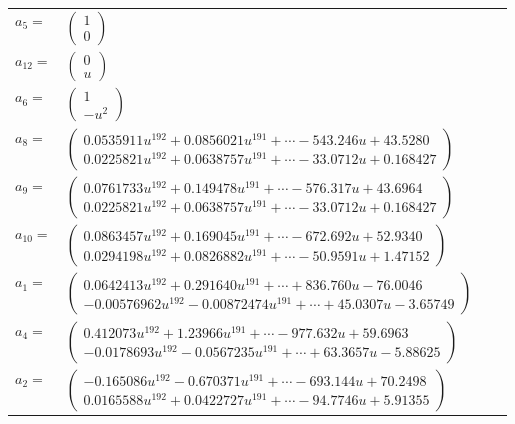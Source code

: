 \documentclass[1p]{elsarticle_modified}
\theoremstyle{definition}
\begin{document}
\begin{tabular}{m{7pt} m{180pt} m{7pt} m{180pt} }
\flushright $a_{5}=$&$\begin{pmatrix}1\\0\end{pmatrix}$ \\
\flushright $a_{12}=$&$\begin{pmatrix}0\\u\end{pmatrix}$ \\
\flushright $a_{6}=$&$\begin{pmatrix}1\\- u^2\end{pmatrix}$ \\
\flushright $a_{8}=$&$\begin{pmatrix}0.0535911 u^{192}+0.0856021 u^{191}+\cdots-543.246 u+43.5280\\0.0225821 u^{192}+0.0638757 u^{191}+\cdots-33.0712 u+0.168427\end{pmatrix}$ \\
\flushright $a_{9}=$&$\begin{pmatrix}0.0761733 u^{192}+0.149478 u^{191}+\cdots-576.317 u+43.6964\\0.0225821 u^{192}+0.0638757 u^{191}+\cdots-33.0712 u+0.168427\end{pmatrix}$ \\
\flushright $a_{10}=$&$\begin{pmatrix}0.0863457 u^{192}+0.169045 u^{191}+\cdots-672.692 u+52.9340\\0.0294198 u^{192}+0.0826882 u^{191}+\cdots-50.9591 u+1.47152\end{pmatrix}$ \\
\flushright $a_{1}=$&$\begin{pmatrix}0.0642413 u^{192}+0.291640 u^{191}+\cdots+836.760 u-76.0046\\-0.00576962 u^{192}-0.00872474 u^{191}+\cdots+45.0307 u-3.65749\end{pmatrix}$ \\
\flushright $a_{4}=$&$\begin{pmatrix}0.412073 u^{192}+1.23966 u^{191}+\cdots-977.632 u+59.6963\\-0.0178693 u^{192}-0.0567235 u^{191}+\cdots+63.3657 u-5.88625\end{pmatrix}$ \\
\flushright $a_{2}=$&$\begin{pmatrix}-0.165086 u^{192}-0.670371 u^{191}+\cdots-693.144 u+70.2498\\0.0165588 u^{192}+0.0422727 u^{191}+\cdots-94.7746 u+5.91355\end{pmatrix}$ \\

\end{tabular}
\end{document}
